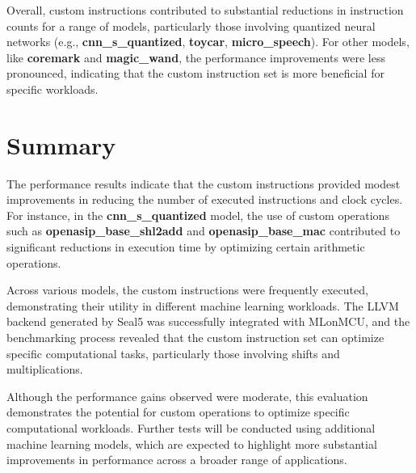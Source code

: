 Overall, custom instructions contributed to substantial reductions in instruction counts for a range of models, particularly those involving quantized neural networks (e.g., \textbf{cnn\_s\_quantized}, \textbf{toycar}, \textbf{micro\_speech}). For other models, like \textbf{coremark} and \textbf{magic\_wand}, the performance improvements were less pronounced, indicating that the custom instruction set is more beneficial for specific workloads.

\section{Summary}

The performance results indicate that the custom instructions provided modest improvements in reducing the number of executed instructions and clock cycles. For instance, in the \textbf{cnn\_s\_quantized} model, the use of custom operations such as \textbf{openasip\_base\_shl2add} and \textbf{openasip\_base\_mac} contributed to significant reductions in execution time by optimizing certain arithmetic operations.

Across various models, the custom instructions were frequently executed, demonstrating their utility in different machine learning workloads. The LLVM backend generated by Seal5 was successfully integrated with MLonMCU, and the benchmarking process revealed that the custom instruction set can optimize specific computational tasks, particularly those involving shifts and multiplications.

Although the performance gains observed were moderate, this evaluation demonstrates the potential for custom operations to optimize specific computational workloads. Further tests will be conducted using additional machine learning models, which are expected to highlight more substantial improvements in performance across a broader range of applications.